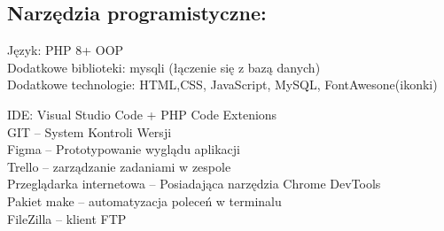 \subsection{Narzędzia programistyczne:}
    \begin{flushleft}
        Język: PHP 8+ OOP \\
        Dodatkowe biblioteki: mysqli (łączenie się z bazą danych)\\
        Dodatkowe technologie: HTML,CSS, JavaScript, MySQL, FontAwesone(ikonki) \newline\newline

        IDE: Visual Studio Code + PHP Code Extenions\\
        GIT – System Kontroli Wersji\\
        Figma – Prototypowanie wyglądu aplikacji \\
        Trello – zarządzanie zadaniami w zespole\\
        Przeglądarka internetowa – Posiadająca narzędzia Chrome DevTools \\
        Pakiet make – automatyzacja poleceń w terminalu\\
        FileZilla – klient FTP\\
    \end{flushleft}
    \pagebreak

